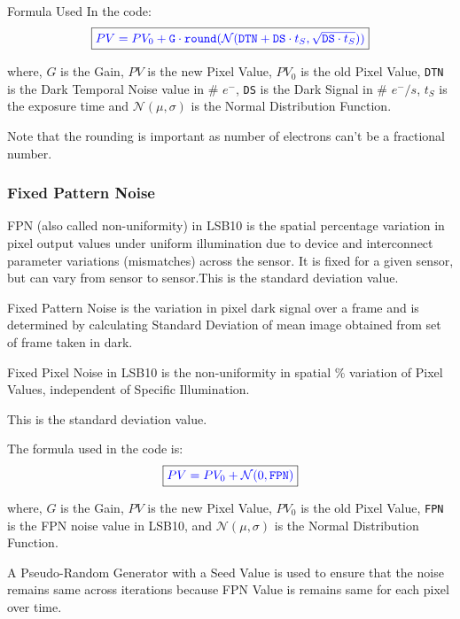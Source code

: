 Formula Used In the code:  
\begin{equation}
    \boxed{ \color{blue} PV = PV_0 + \texttt{G} \cdot \texttt{round}(\mathcal{N}(\texttt{DTN} + \texttt{DS} \cdot t_S, \sqrt{\texttt{DS} \cdot t_S}))   \color{black}}
\end{equation}

where, $G$ is the Gain, $PV$ is the new Pixel Value, $PV_0$ is the old Pixel Value, \texttt{DTN} is the Dark Temporal Noise value in \# $e^-$, \texttt{DS} is the Dark Signal in \# $e^-/s$, $t_S$ is the exposure time and $\mathcal{N}(\mu, \sigma)$ is the Normal Distribution Function.

Note that the rounding is important as number of electrons can't be a fractional number. 


\subsubsection{Fixed Pattern Noise} %
FPN (also called non-uniformity) in LSB10 is the spatial percentage variation in pixel output values under uniform illumination due to device and interconnect parameter variations (mismatches) across the sensor. It is fixed for a given sensor, but can vary from sensor to sensor.This is the standard deviation value.

Fixed Pattern Noise is the variation in pixel dark signal over a frame and is determined by calculating Standard Deviation of mean image obtained from set of frame taken in dark.

Fixed Pixel Noise in LSB10 is the non-uniformity in spatial \% variation of
Pixel Values, independent of Specific Illumination.

This is the standard deviation value.

The formula used in the code is:
\begin{equation}
    \boxed{ \color{blue} PV = PV_0 + \mathcal{N}(0, \texttt{FPN})   \color{black}}
\end{equation}

where, $G$ is the Gain, $PV$ is the new Pixel Value, $PV_0$ is the old Pixel Value, \texttt{FPN} is the FPN noise value in LSB10, and $\mathcal{N}(\mu, \sigma)$ is the Normal Distribution Function.

A Pseudo-Random Generator with a Seed Value is used to ensure that the noise remains same across iterations because FPN Value is remains same for each pixel over time.

